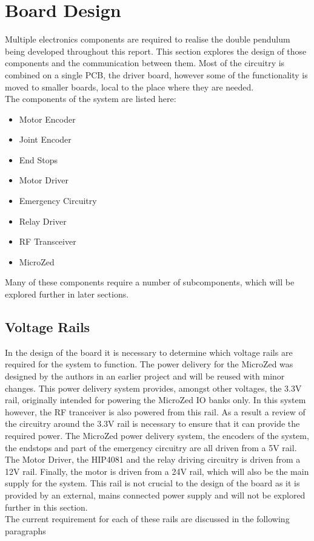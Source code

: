 \section{Board Design} %
\label{sec:board_design}
Multiple electronics components are required to realise the double pendulum being developed throughout this report.
This section explores the design of those components and the communication between them.
Most of the circuitry is combined on a single PCB, the driver board, however some of the functionality is moved to smaller boards, local to the place where they are needed.\\

The components of the system are listed here:
\begin{itemize}
	\item Motor Encoder
	\item Joint Encoder
	\item End Stops
	\item Motor Driver
	\item Emergency Circuitry
	\item Relay Driver
	\item RF Transceiver
	\item MicroZed 
\end{itemize}
Many of these components require a number of subcomponents, which will be explored further in later sections.

\subsection{Voltage Rails} %
\label{sub:voltage_rails}
In the design of the board it is necessary to determine which voltage rails are required for the system to function.
The power delivery for the MicroZed was designed by the authors in an earlier project \cite{isaswarm} and will be reused with minor changes.
This power delivery system provides, amongst other voltages, the 3.3V rail, originally intended for powering the MicroZed IO banks only.
In this system however, the RF tranceiver is also powered from this rail.
As a result a review of the circuitry around the 3.3V rail is necessary to ensure that it can provide the required power.
The MicroZed power delivery system, the encoders of the system, the endstops and part of the emergency circuitry are all driven from a 5V rail.
The Motor Driver, the HIP4081 \cite{driver} and the relay driving circuitry is driven from a 12V rail.
Finally, the motor is driven from a 24V rail, which will also be the main supply for the system.
This rail is not crucial to the design of the board as it is provided by an external, mains connected power supply and will not be explored further in this section.\\
The current requirement for each of these rails are discussed in the following paragraphs

